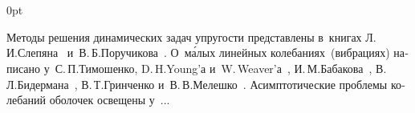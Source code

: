 \section*{\small \wordforbibliography}

\begin{changemargin}{\parindent}{0pt}
\fontsize{10}{12}\selectfont

\begin{otherlanguage}{russian}

Методы решения динамических задач упругости представлены в~книгах
Л.\,И.\;Слепяна~\cite{slepyan-nonstationeryelasticwaves}
и~В.\,Б.\;Поручикова~\cite{poruchikov-dynamicelasticity}.
О~м\'{а}лых линейных колебаниях~(вибрациях) написано
у~С.\,П.\;Тимошенко, D.\,H.\:Young’а и~W.\,Weaver’а~\cite{timoshenko.young.weaver},
И.\,М.\;Бабакова~\cite{babakov-theoryofoscillations},
В.\,Л.\;Бидермана~\cite{biderman-oscillations},
В.\,Т.\;Гринченко и~В.\,В.\;Мелешко~\cite{grinchenko.meleshko}.
Асимптотические проблемы колебаний оболочек освещены
у~...

\end{otherlanguage}

\end{changemargin}

